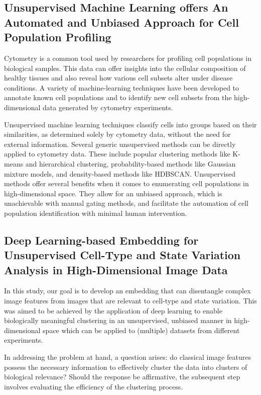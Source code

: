 \documentclass[12pt,a4paper]{article}
\begin{document}
\subsection{Unsupervised Machine Learning offers An Automated and Unbiased Approach for Cell Population Profiling}

Cytometry is a common tool used by researchers for profiling cell populations in biological samples. This data can offer insights into the cellular composition of healthy tissues and also reveal how various cell subsets alter under disease conditions. A variety of machine-learning techniques have been developed to annotate known cell populations and to identify new cell subsets from the high-dimensional data generated by cytometry experiments.

Unsupervised machine learning techniques classify cells into groups based on their similarities, as determined solely by cytometry data, without the need for external information. Several generic unsupervised methods can be directly applied to cytometry data. These include popular clustering methods like K-means and hierarchical clustering, probability-based methods like Gaussian mixture models, and density-based methods like HDBSCAN. Unsupervised methods offer several benefits when it comes to enumerating cell populations in high-dimensional space. They allow for an unbiased approach, which is unachievable with manual gating methods, and facilitate the automation of cell population identification with minimal human intervention.


\subsection{Deep Learning-based Embedding for Unsupervised Cell-Type and State Variation Analysis in High-Dimensional Image Data}
In this study, our goal is to develop an embedding that can disentangle complex image features from images that are relevant to cell-type and state variation. This was aimed to be achieved by the application of deep learning to enable biologically meaningful clustering in an unsupervised, unbiased manner in high-dimensional space which can be applied to (multiple) datasets from different experiments.

In addressing the problem at hand, a question arises: do classical image features possess the necessary information to effectively cluster the data into clusters of biological relevance? Should the response be affirmative, the subsequent step involves evaluating the efficiency of the clustering process.
\end{document}
